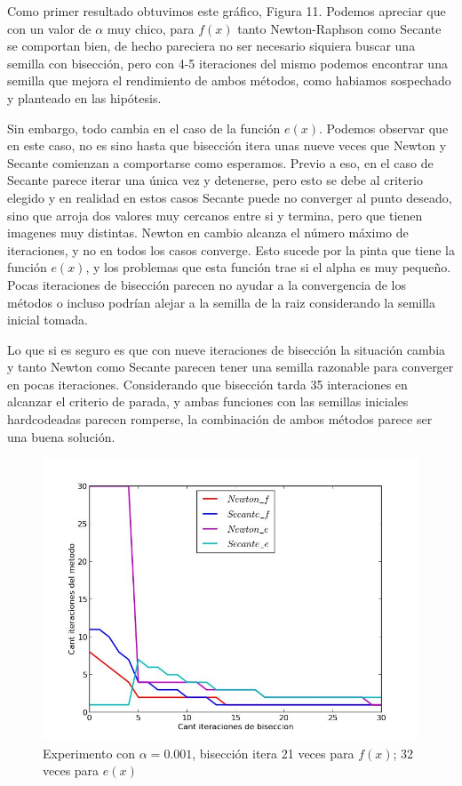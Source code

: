 Como primer resultado obtuvimos este gráfico, Figura 11. Podemos apreciar que con un valor de $\alpha$ muy chico, para $f(x)$ tanto Newton-Raphson como Secante se comportan bien, de hecho pareciera no ser necesario siquiera buscar una semilla con bisección, pero con 4-5 iteraciones del mismo podemos encontrar una semilla que mejora el rendimiento de ambos métodos, como habiamos sospechado y planteado en las hipótesis.

Sin embargo, todo cambia en el caso de la función $e(x)$. Podemos observar que en este caso, no es sino hasta que bisección itera unas nueve veces que Newton y Secante comienzan a comportarse como esperamos. Previo a eso, en el caso de Secante parece iterar una única vez y detenerse, pero esto se debe al criterio elegido y en realidad en estos casos Secante puede no converger al punto deseado, sino que arroja dos valores muy cercanos entre si y termina, pero que tienen imagenes muy distintas. Newton en cambio alcanza el número máximo de iteraciones, y no en todos los casos converge. Esto sucede por la pinta que tiene la función $e(x)$, y los problemas que esta función trae si el alpha es muy pequeño. Pocas iteraciones de bisección parecen no ayudar a la convergencia de los métodos o incluso podrían alejar a la semilla de la raiz considerando la semilla inicial tomada.

Lo que si es seguro es que con nueve iteraciones de bisección la situación cambia y tanto Newton como Secante parecen tener una semilla razonable para converger en pocas iteraciones. Considerando que bisección tarda 35 interaciones en alcanzar el criterio de parada, y ambas funciones con las semillas iniciales hardcodeadas parecen romperse, la combinación de ambos métodos parece ser una buena solución.

\begin{figure}[!h]
	\begin{center}
		  \includegraphics[scale=0.5]{../Imagenes/exp4/experimento_biseccion_2.jpg}
		  \caption{Experimento con $\alpha = 0.001$, bisección itera 21 veces para $f(x)$; 32 veces para $e(x)$}
		  \label{fig:contra1}
	\end{center}
\end{figure}
\FloatBarrier

